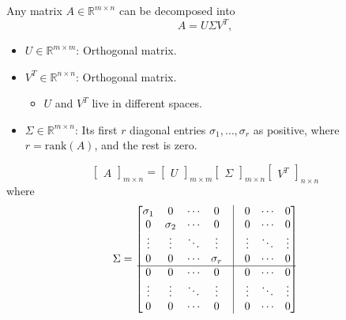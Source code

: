 \begin{definition}
        Any matrix \( A \in \mathbb{R}^{m \times n} \) can be decomposed into
    \begin{equation*}
        A = U \Sigma V^T,
    \end{equation*}
    \begin{itemize}
        \item \( U \in \mathbb{R}^{m \times m} \): Orthogonal matrix. 
        \item \( V^T \in \mathbb{R}^{n \times n} \): Orthogonal matrix. 
        \begin{itemize}
            \item $U$ and $V^T$ live in different spaces.
        \end{itemize}
        \item \( \Sigma \in \mathbb{R}^{m \times n} \): Its first \( r \) diagonal entries \( \sigma_1, \dots, \sigma_r \) as positive, where \( r = \text{rank}(A) \), and the rest is zero.
    \end{itemize}

    \[
    \begin{bmatrix} A \end{bmatrix}_{m \times n} = \begin{bmatrix} U \end{bmatrix}_{m \times m} \begin{bmatrix} \Sigma \end{bmatrix}_{m \times n} \begin{bmatrix} V^T \end{bmatrix}_{n \times n}
    \]
    where
   \[
    \Sigma = \begin{bmatrix}
    \sigma_1 & 0       & \cdots & 0       & \vline & 0       & \cdots & 0 \\
    0       & \sigma_2 & \cdots & 0       & \vline & 0       & \cdots & 0 \\
    \vdots  & \vdots   & \ddots & \vdots  & \vline & \vdots  & \ddots & \vdots \\
    0       & 0        & \cdots & \sigma_r & \vline & 0       & \cdots & 0 \\
    \hline
    0       & 0        & \cdots & 0       & \vline & 0       & \cdots & 0 \\
    \vdots  & \vdots   & \ddots & \vdots  & \vline & \vdots  & \ddots & \vdots \\
    0       & 0        & \cdots & 0       & \vline & 0       & \cdots & 0 \\
    \end{bmatrix}
    \]
\end{definition}

